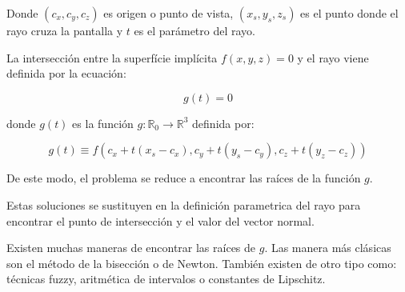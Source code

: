 Donde $(c_x,c_y,c_z)$ es origen o punto de vista, $(x_s,y_s,z_s)$ es el punto donde el rayo cruza la pantalla y $t$ es el parámetro del rayo.
\par La intersección entre la superfície implícita $f(x,y,z) = 0$ y el rayo viene definida por la ecuación:

$$g(t) = 0$$

donde $g(t)$ es la función $g : \mathbb{R}_0 \to \mathbb{R}^3$ definida por:

$$g(t) \equiv f(c_x + t(x_s - c_x), c_y + t(y_s - c_y), c_z + t(y_z - c_z))$$

De este modo, el problema se reduce a encontrar las raíces de la función $g$.
\par Estas soluciones se sustituyen en la definición parametrica del rayo para encontrar el punto de intersección y el valor del vector normal.
\par Existen muchas maneras  de encontrar las raíces de $g$. Las manera más clásicas son el método de la bisección o de Newton\cite{Hart01}. También existen de otro tipo como: técnicas fuzzy,\cite{Foufou96} aritmética de intervalos\cite{Mitchell90} o constantes de Lipschitz.\cite{Kalra89} 